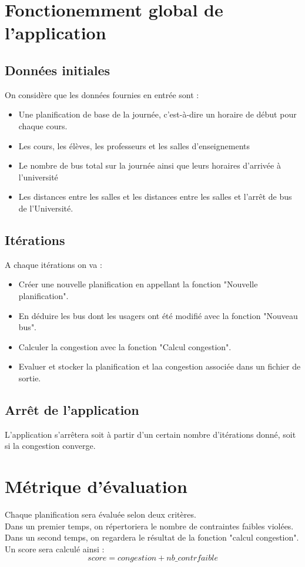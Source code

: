 \documentclass[a4paper,11pt]{article}
\begin{document}
\section{Fonctionemment global de l'application}
	\subsection{Données initiales}
		On considère que les données fournies en entrée sont : 
		\begin{itemize}
				\item Une planification de base de la journée, c'est-à-dire un horaire de début pour chaque cours.
				\item Les cours, les élèves, les professeurs et les salles d'enseignements
				\item Le nombre de bus total sur la journée ainsi que leurs horaires d'arrivée à l'université
				\item Les distances entre les salles et les distances entre les salles et l'arrêt de bus de l'Université.
			\end{itemize}

	\subsection{Itérations}
		A chaque itérations on va :
		\begin{itemize}
				\item Créer une nouvelle planification en appellant la fonction "Nouvelle planification".
				\item En déduire les bus dont les usagers ont été modifié avec la fonction "Nouveau bus".
				\item Calculer la congestion avec la fonction "Calcul congestion".
				\item Evaluer et stocker la planification et laa congestion associée dans un fichier de sortie.
			\end{itemize}
	\subsection{Arrêt de l'application}
		L'application s'arrêtera soit à partir d'un certain nombre d'itérations donné, soit si la congestion converge.		

\section{Métrique d'évaluation}
	Chaque planification sera évaluée selon deux critères.\\
	Dans un premier temps, on répertoriera le nombre de contraintes faibles violées.\\
	Dans un second temps, on regardera le résultat de la fonction "calcul congestion".
	Un score sera calculé ainsi : 
	$$score  = congestion + nb\_contrfaible$$
\end{document}
